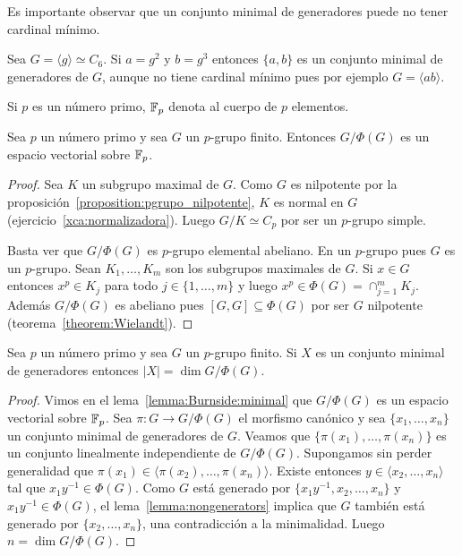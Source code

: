 Es importante observar que un conjunto minimal de generadores puede no
tener cardinal mínimo. 
	
\begin{example}
	Sea $G=\langle g\rangle\simeq C_6$.  Si $a=g^2$ y
	$b=g^3$ entonces $\{a,b\}$ es un conjunto minimal de generadores de $G$,
	aunque no tiene cardinal mínimo pues por ejemplo $G=\langle ab\rangle$.
\end{example}
	
Si $p$ es un número primo, $\mathbb{F}_p$ denota al cuerpo de $p$ elementos. 

\begin{lemma}
	\label{lemma:Burnside:minimal}
	Sea $p$ un número primo y sea 
	$G$ un $p$-grupo finito. Entonces $G/\Phi(G)$ es un espacio vectorial
	sobre $\mathbb{F}_p$.
\end{lemma}

\begin{proof}
	Sea $K$ un subgrupo maximal de $G$. Como $G$ es nilpotente por la
	proposición~\ref{proposition:pgrupo_nilpotente}, $K$ es normal en $G$
	(ejercicio~\ref{xca:normalizadora}). Luego $G/K\simeq C_p$ por ser un $p$-grupo
	simple. 
	
	Basta ver que $G/\Phi(G)$ es $p$-grupo elemental abeliano. En un $p$-grupo
	pues $G$ es un $p$-grupo.  Sean $K_1,\dots,K_m$ son los subgrupos maximales
	de $G$. Si $x\in G$ entonces $x^p\in K_j$ para todo $j\in\{1,\dots,m\}$ y
	luego $x^p\in\Phi(G)=\cap_{j=1}^m K_j$. Además $G/\Phi(G)$ es abeliano pues
	$[G,G]\subseteq \Phi(G)$ por ser $G$ nilpotente
	(teorema~\ref{theorem:Wielandt}). 
\end{proof}

\begin{theorem}[Burnside]
	\label{theorem:Burnside:basis}
	Sea $p$ un número primo y sea $G$ un $p$-grupo finito. Si $X$ es un
	conjunto minimal de generadores entonces $|X|=\dim G/\Phi(G)$. 
\end{theorem}


\begin{proof}
	Vimos en el lema~\ref{lemma:Burnside:minimal} que $G/\Phi(G)$ es un espacio
	vectorial sobre $\mathbb{F}_p$. Sea $\pi\colon G\to G/\Phi(G)$ el morfismo canónico
	y sea $\{x_1,\dots,x_n\}$ un conjunto minimal de generadores de $G$.
	Veamos que $\{\pi(x_1),\dots,\pi(x_n)\}$ es un conjunto linealmente
	independiente de $G/\Phi(G)$.  Supongamos sin perder generalidad que
	$\pi(x_1)\in\langle \pi(x_2),\dots,\pi(x_n)\rangle$. Existe entonces $y\in
	\langle x_2,\dots,x_n\rangle$ tal que $x_1y^{-1}\in\Phi(G)$. Como $G$ está
	generado por $\{x_1y^{-1},x_2,\dots,x_n\}$ y $x_1y^{-1}\in\Phi(G)$, el
	lema~\ref{lemma:nongenerators} implica que $G$ también está generado por
	$\{x_2,\dots,x_n\}$, una contradicción a la minimalidad. Luego $n=\dim
	G/\Phi(G)$.
\end{proof}


